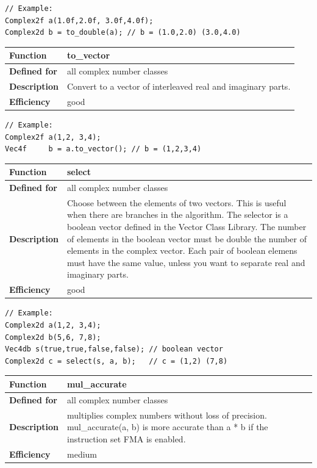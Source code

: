 \documentclass[11pt,a4paper,oneside,openright]{report}
\newcommand{\vspacesmall}{\vspace{3mm}}
\newcommand{\vspacebig}{\vspace{6mm}}
\begin{document}
\begin{lstlisting}[frame=none]
// Example:
Complex2f a(1.0f,2.0f, 3.0f,4.0f);
Complex2d b = to_double(a); // b = (1.0,2.0) (3.0,4.0)
\end{lstlisting}
\vspacebig


\begin{tabular}{|p{25mm}|p{100mm}|}
\hline
\bfseries Function & to\_vector \\ \hline
\bfseries Defined for & all complex number classes  \\ \hline
\bfseries Description & Convert to a vector of interleaved real and imaginary parts. \\ \hline
\bfseries Efficiency & good \\ \hline
\end{tabular}
\vspacesmall

\begin{lstlisting}[frame=none]
// Example:
Complex2f a(1,2, 3,4);
Vec4f     b = a.to_vector(); // b = (1,2,3,4)
\end{lstlisting}
\vspacebig


\begin{tabular}{|p{25mm}|p{100mm}|}
\hline
\bfseries Function & select \\ \hline
\bfseries Defined for & all complex number classes \\ \hline
\bfseries Description & Choose between the elements of two vectors.
This is useful when there are branches in the algorithm.\newline
The selector is a boolean vector defined in the Vector Class Library.
The number of elements in the boolean vector must be double the number of elements in the complex vector. Each pair of boolean elemens must have the same value, unless you want to separate real and imaginary parts. \\ \hline
\bfseries Efficiency & good \\ \hline
\end{tabular}
\vspacesmall

\begin{lstlisting}[frame=none]
// Example:
Complex2d a(1,2, 3,4);
Complex2d b(5,6, 7,8);
Vec4db s(true,true,false,false); // boolean vector
Complex2d c = select(s, a, b);   // c = (1,2) (7,8)
\end{lstlisting}
\vspacebig

\begin{tabular}{|p{25mm}|p{100mm}|}
\hline
\bfseries Function & mul\_accurate \\ \hline
\bfseries Defined for & all complex number classes  \\ \hline
\bfseries Description & multiplies complex numbers without loss of precision.  \newline
mul\_accurate(a, b) is more accurate than a * b if the instruction set FMA is enabled.\\ \hline
\bfseries Efficiency & medium \\ \hline
\end{tabular}
\vspacebig
\end{document}
